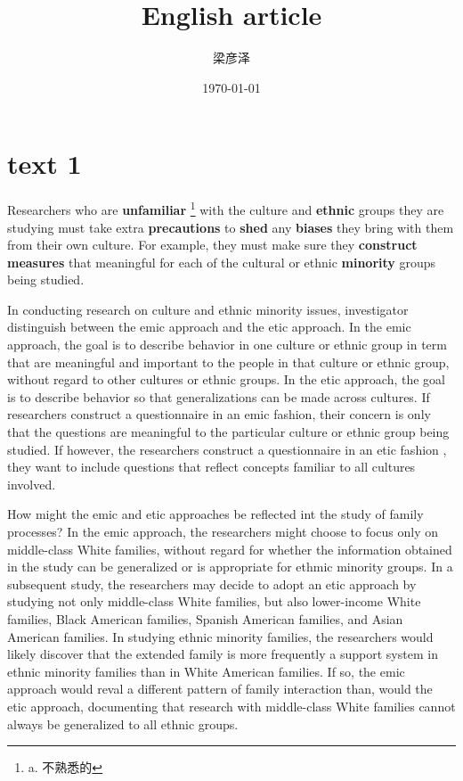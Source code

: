 \documentclass[UTF8]{ctexart}
\title{English article}
\author{梁彦泽}
\date{\today}
\newcommand\Emph{\textbf}
\begin{document}
\maketitle
\tableofcontents
\newpage

\section{text 1}
Researchers who are \Emph{unfamiliar} \footnote{a. 不熟悉的} with the culture and \Emph{ethnic} groups they are studying
must take extra \Emph{precautions} to \Emph{shed} any \Emph{biases} they bring with them from their own culture. For example,
they must make sure they \Emph{construct measures} that meaningful for each of the cultural or ethnic \Emph{minority} groups being studied.


In conducting research on culture and ethnic minority issues, investigator distinguish between the emic approach and the 
etic approach. In the emic approach, the goal is to describe behavior in one culture or ethnic group in term that are meaningful
and important to the people in that culture or ethnic group, without regard to other cultures or ethnic groups. In the etic approach, the goal is to
describe behavior so that generalizations can be made across cultures. If researchers construct a questionnaire in an emic fashion, their concern is only that the 
questions are meaningful to the particular culture or ethnic group being studied. If however, the researchers construct a questionnaire in an etic fashion , they
want to include questions that reflect concepts familiar to all cultures involved.

How might the emic and etic approaches be reflected int the study of family processes? In the emic approach, the researchers might choose to focus only on middle-class
White families, without regard for whether the information obtained in the study can be generalized or is appropriate for ethmic minority groups. In a subsequent study,
the researchers may decide to adopt an etic approach by studying not only middle-class White families, but also lower-income White families, Black American families,
Spanish American families, and Asian American families. In studying ethnic minority families, the researchers would likely discover that the extended family is more 
frequently a support system in ethnic minority families than in White American families. If so, the emic approach would reval a different pattern of family interaction
than, would the etic approach, documenting that research with middle-class White families cannot always be generalized to all ethnic groups.
\end{document}
